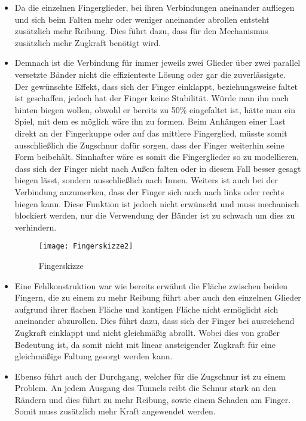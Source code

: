 \documentclass[titlepage,12pt,twoside]{article}
\begin{document}
\begin{itemize}
	\item Da die einzelnen Fingerglieder, bei ihren Verbindungen aneinander 
	aufliegen und sich beim Falten mehr oder weniger aneinander abrollen 
	entsteht zusätzlich mehr Reibung. Dies führt dazu, dass für den Mechanismus 
	zusätzlich mehr Zugkraft benötigt wird.
	\item Demnach ist die Verbindung für immer jeweils zwei Glieder über zwei 
	parallel versetzte Bänder nicht die effizienteste Lösung oder gar die zuverlässigste. 
	Der gewünschte Effekt, dass sich der Finger einklappt, beziehungsweise 
	faltet ist geschaffen, jedoch hat der Finger keine Stabilität. Würde man 
	ihn nach hinten biegen wollen, obwohl er bereits zu 50\% eingefaltet ist, 
	hätte man ein Spiel, mit dem es möglich wäre ihn zu formen. Beim Anhängen 
	einer Last direkt an der Fingerkuppe oder auf das mittlere Fingerglied, 
	müsste somit ausschließlich die Zugschnur dafür sorgen, dass der Finger 
	weiterhin seine Form beibehält. Sinnhafter wäre es somit die Fingerglieder 
	so zu modellieren, dass sich der Finger nicht nach Außen falten oder in 
	diesem Fall besser gesagt biegen lässt, sondern ausschließlich nach Innen. 
	Weiters ist auch bei der Verbindung anzumerken, dass der Finger sich auch 
	nach links oder rechts biegen kann. Diese Funktion ist jedoch nicht 
	erwünscht und muss mechanisch blockiert werden, nur die Verwendung der 
	Bänder ist zu schwach um dies zu verhindern.
	\begin{figure}[H]
		\begin{center}
			\scalebox{1}
			{\texttt{[image: Fingerskizze2]}}
			\caption{Fingerskizze}
			\label{fig:Fingerskizze2}			
		\end{center}
	\end{figure}
	\hfill \break
	\item Eine Fehlkonstruktion war wie bereits erwähnt die Fläche zwischen 
	beiden Fingern, die zu einem zu mehr Reibung führt aber auch den einzelnen 
	Glieder aufgrund ihrer flachen Fläche und kantigen Fläche nicht ermöglicht 
	sich aneinander abzurollen. Dies führt dazu, dass sich der Finger bei ausreichend 
	Zugkraft einklappt und nicht gleichmäßig abrollt. Wobei dies von großer 
	Bedeutung ist, da somit nicht mit linear ansteigender Zugkraft für eine 
	gleichmäßige Faltung gesorgt werden kann.
	\item Ebenso führt auch der Durchgang, welcher für die Zugschnur ist zu 
	einem Problem. An jedem Ausgang des Tunnels reibt die Schnur stark an den 
	Rändern und dies führt zu mehr Reibung, sowie einem Schaden am Finger.
	Somit muss zusätzlich mehr Kraft angewendet werden.
\end{itemize}
\end{document}
